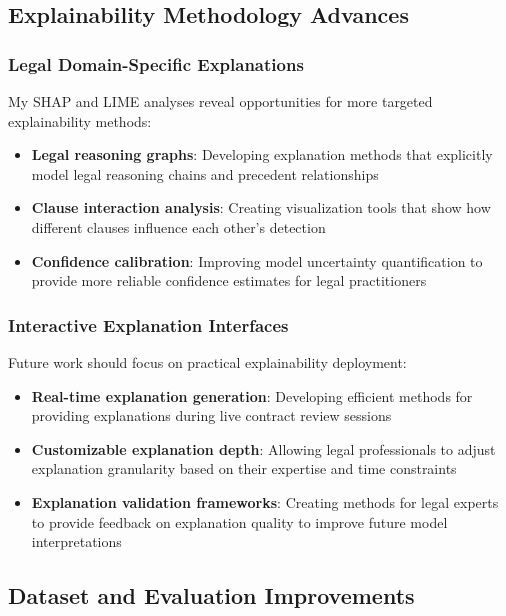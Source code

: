 \subsection{Explainability Methodology Advances}
\label{subsec:explainability_advances}

\subsubsection{Legal Domain-Specific Explanations}
My SHAP and LIME analyses reveal opportunities for more targeted explainability methods:

\begin{itemize}
\item \textbf{Legal reasoning graphs}: Developing explanation methods that explicitly model legal reasoning chains and precedent relationships
\item \textbf{Clause interaction analysis}: Creating visualization tools that show how different clauses influence each other's detection
\item \textbf{Confidence calibration}: Improving model uncertainty quantification to provide more reliable confidence estimates for legal practitioners
\end{itemize}

\subsubsection{Interactive Explanation Interfaces}
Future work should focus on practical explainability deployment:

\begin{itemize}
\item \textbf{Real-time explanation generation}: Developing efficient methods for providing explanations during live contract review sessions
\item \textbf{Customizable explanation depth}: Allowing legal professionals to adjust explanation granularity based on their expertise and time constraints
\item \textbf{Explanation validation frameworks}: Creating methods for legal experts to provide feedback on explanation quality to improve future model interpretations
\end{itemize}

\subsection{Dataset and Evaluation Improvements}
\label{subsec:dataset_improvements}

